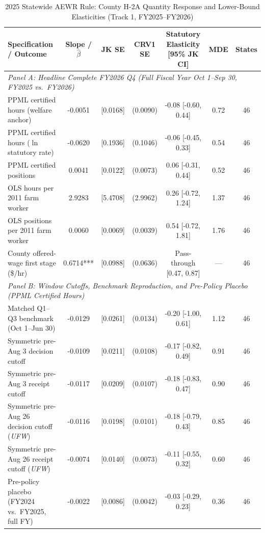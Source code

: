 \begin{table}[!htbp]
\centering
\caption{2025 Statewide AEWR Rule: County H-2A Quantity Response and Lower-Bound Elasticities (Track 1, FY2025--FY2026)}
\label{tab:policy_2025_quantity}
\small
\begin{tabular}{lcccccc}
\toprule
Specification / Outcome & Slope / $\hat{\beta}$ & JK SE & CRV1 SE & Statutory Elasticity [95\% JK CI] & MDE & States \\
\midrule
\multicolumn{7}{l}{\textit{Panel A: Headline Complete FY2026 Q4 (Full Fiscal Year Oct 1--Sep 30, FY2025 vs.\ FY2026)}} \\
PPML certified hours (welfare anchor) & -0.0051 & [0.0168] & (0.0090) & -0.08 [-0.60, 0.44] & 0.72 & 46 \\
PPML certified hours ($\ln$ statutory rate) & -0.0620 & [0.1936] & (0.1046) & -0.06 [-0.45, 0.33] & 0.54 & 46 \\
PPML certified positions & 0.0041 & [0.0122] & (0.0073) & 0.06 [-0.31, 0.44] & 0.52 & 46 \\
OLS hours per 2011 farm worker & 2.9283 & [5.4708] & (2.9962) & 0.26 [-0.72, 1.24] & 1.37 & 46 \\
OLS positions per 2011 farm worker & 0.0060 & [0.0069] & (0.0039) & 0.54 [-0.72, 1.81] & 1.76 & 46 \\
County offered-wage first stage (\$/hr) & 0.6714*** & [0.0988] & (0.0636) & Pass-through [0.47, 0.87] & --- & 46 \\
\midrule
\multicolumn{7}{l}{\textit{Panel B: Window Cutoffs, Benchmark Reproduction, and Pre-Policy Placebo (PPML Certified Hours)}} \\
Matched Q1--Q3 benchmark (Oct 1--Jun 30) & -0.0129 & [0.0261] & (0.0134) & -0.20 [-1.00, 0.61] & 1.12 & 46 \\
Symmetric pre-Aug 3 decision cutoff & -0.0109 & [0.0211] & (0.0108) & -0.17 [-0.82, 0.49] & 0.91 & 46 \\
Symmetric pre-Aug 3 receipt cutoff & -0.0117 & [0.0209] & (0.0107) & -0.18 [-0.83, 0.47] & 0.90 & 46 \\
Symmetric pre-Aug 26 decision cutoff (\textit{UFW}) & -0.0116 & [0.0198] & (0.0101) & -0.18 [-0.79, 0.43] & 0.85 & 46 \\
Symmetric pre-Aug 26 receipt cutoff (\textit{UFW}) & -0.0074 & [0.0140] & (0.0073) & -0.11 [-0.55, 0.32] & 0.60 & 46 \\
Pre-policy placebo (FY2024 vs.\ FY2025, full FY) & -0.0022 & [0.0086] & (0.0042) & -0.03 [-0.29, 0.23] & 0.36 & 46 \\

\end{tabular}
\end{table}

